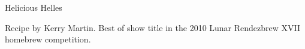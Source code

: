 \begin{recipe}{Helicious Helles} %

\begin{aboutblock}
Recipe by Kerry Martin. Best of show title in the 2010 Lunar Rendezbrew XVII
homebrew competition. 
\end{aboutblock}


\begin{methodandtiming}
 
\begin{mashsteps}
\end{mashsteps}

\begin{fermentationsteps}
\end{fermentationsteps}

\end{methodandtiming}

\recipebreak

\begin{ingredientsblock}

\begin{malts}
\end{malts}

\begin{hops}
\end{hops}


\end{ingredientsblock}

\end{recipe}

